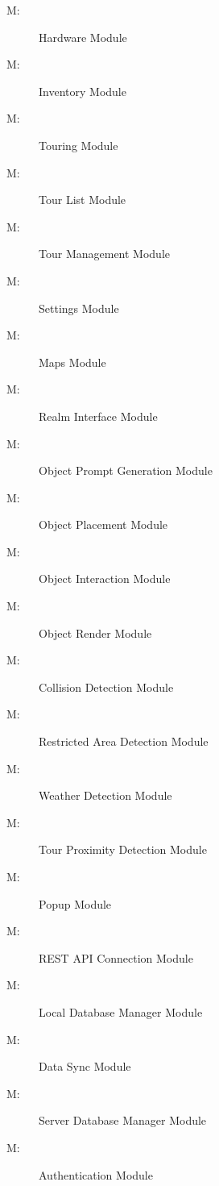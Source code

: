 \documentclass[12pt, titlepage]{article}
\newcounter{mnum}
\newcommand{\mthemnum}{M\themnum}
\begin{document}
\begin{description}
\item [ \mthemnum \label{mHardware}:] Hardware Module
\item [ \mthemnum \label{mInventory}:] Inventory Module
\item [ \mthemnum \label{mTouring}:] Touring Module
\item [ \mthemnum \label{mTourList}:] Tour List Module
\item [ \mthemnum \label{mTourManagement}:] Tour Management Module
\item [ \mthemnum \label{mSettings}:] Settings Module
\item [ \mthemnum \label{mMaps}:] Maps Module
\item [ \mthemnum \label{mRealm}:] Realm Interface Module
\item [ \mthemnum \label{mPromptGen}:] Object Prompt Generation Module
\item [ \mthemnum \label{mPlacement}:] Object Placement Module
\item [ \mthemnum \label{mInteraction}:] Object Interaction Module
\item [ \mthemnum \label{mRender}:] Object Render Module
\item [ \mthemnum \label{mCollision}:] Collision Detection Module
\item [ \mthemnum \label{mRA}:] Restricted Area Detection Module
\item [ \mthemnum \label{mWeather}:] Weather Detection Module
\item [ \mthemnum \label{mTourProx}:] Tour Proximity Detection Module
\item [ \mthemnum \label{mPopup}:] Popup Module
\item [ \mthemnum \label{mRESTAPI}:] REST API Connection Module
\item [ \mthemnum \label{mLocalDB}:] Local Database Manager Module
\item [ \mthemnum \label{mDataSync}:] Data Sync Module
\item [ \mthemnum \label{mServerDB}:] Server Database Manager Module
\item [ \mthemnum \label{mAuth}:] Authentication Module
\end{description}
\end{document}
